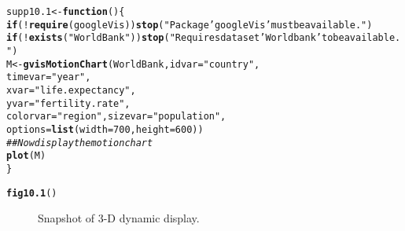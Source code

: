 \documentclass[12pt, a4paper,  BCOR=8.25mm, DIV=15]{scrartcl}\usepackage[]{graphicx}\usepackage[]{color}
\makeatletter
\newcommand{\hlnum}[1]{\textcolor[rgb]{0.686,0.059,0.569}{#1}}%
\newcommand{\hlstr}[1]{\textcolor[rgb]{0.192,0.494,0.8}{#1}}%
\newcommand{\hlcom}[1]{\textcolor[rgb]{0.678,0.584,0.686}{\textit{#1}}}%
\newcommand{\hlopt}[1]{\textcolor[rgb]{0,0,0}{#1}}%
\newcommand{\hlstd}[1]{\textcolor[rgb]{0.345,0.345,0.345}{#1}}%
\newcommand{\hlkwa}[1]{\textcolor[rgb]{0.161,0.373,0.58}{\textbf{#1}}}%
\newcommand{\hlkwb}[1]{\textcolor[rgb]{0.69,0.353,0.396}{#1}}%
\newcommand{\hlkwc}[1]{\textcolor[rgb]{0.333,0.667,0.333}{#1}}%
\newcommand{\hlkwd}[1]{\textcolor[rgb]{0.737,0.353,0.396}{\textbf{#1}}}%
\newenvironment{kframe}{%
 \def\at@end@of@kframe{}%
 \ifinner\ifhmode%
  \def\at@end@of@kframe{\end{minipage}}%
  \begin{minipage}{\columnwidth}%
 \fi\fi%
 \def\FrameCommand##1{\hskip\@totalleftmargin \hskip-\fboxsep
 \colorbox{shadecolor}{##1}\hskip-\fboxsep
     \hskip-\linewidth \hskip-\@totalleftmargin \hskip\columnwidth}%
 \MakeFramed {\advance\hsize-\width
   \@totalleftmargin\z@ \linewidth\hsize
   \@setminipage}}%
 {\par\unskip\endMakeFramed%
 \at@end@of@kframe}
\newenvironment{knitrout}{}{} %
\makeatother
\begin{document}
\begin{knitrout}
\color{fgcolor}\begin{kframe}
\begin{alltt}
\hlstd{supp10.1} \hlkwb{<-} \hlkwa{function}\hlstd{()\{}
\hlkwa{if}\hlstd{(}\hlopt{!}\hlkwd{require}\hlstd{(googleVis))}\hlkwd{stop}\hlstd{(}\hlstr{"Package 'googleVis' must be available."}\hlstd{)}
\hlkwa{if}\hlstd{(}\hlopt{!}\hlkwd{exists}\hlstd{(}\hlstr{"WorldBank"}\hlstd{))}\hlkwd{stop}\hlstd{(}\hlstr{"Requires dataset 'Worldbank' to be available."}\hlstd{)}
\hlstd{M} \hlkwb{<-} \hlkwd{gvisMotionChart}\hlstd{(WorldBank,} \hlkwc{idvar}\hlstd{=}\hlstr{"country"}\hlstd{,}
          \hlkwc{timevar}\hlstd{=}\hlstr{"year"}\hlstd{,}
          \hlkwc{xvar}\hlstd{=}\hlstr{"life.expectancy"}\hlstd{,}
          \hlkwc{yvar}\hlstd{=}\hlstr{"fertility.rate"}\hlstd{,}
          \hlkwc{colorvar}\hlstd{=}\hlstr{"region"}\hlstd{,} \hlkwc{sizevar}\hlstd{=}\hlstr{"population"}\hlstd{,}
          \hlkwc{options}\hlstd{=}\hlkwd{list}\hlstd{(}\hlkwc{width}\hlstd{=}\hlnum{700}\hlstd{,} \hlkwc{height}\hlstd{=}\hlnum{600}\hlstd{))}
\hlcom{## Now display the motion chart}
\hlkwd{plot}\hlstd{(M)}
\hlstd{\}}
\end{alltt}
\end{kframe}
\end{knitrout}

\begin{knitrout}
\color{fgcolor}\begin{kframe}
\begin{alltt}
\hlkwd{fig10.1}\hlstd{()}
\end{alltt}
\end{kframe}
\end{knitrout}

\begin{figure}

\caption{Snapshot of 3-D dynamic display.}\label{fig:rgl-ex}
\end{figure}
\end{document}

